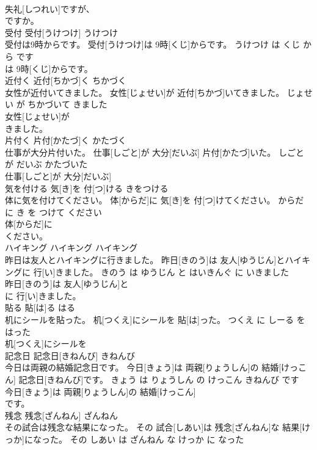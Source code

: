 \documentclass[8pt]{extreport}
\begin{document}
\begin{CJK}{UTF8}{min}
\\	失礼[しつれい]ですが、
\\	ですか。		
\\	受付	受付[うけつけ]	うけつけ	
\\	受付は9時からです。	受付[うけつけ]は 9時[くじ]からです。	うけつけ は くじ から です	
\\	は 9時[くじ]からです。		
\\	近付く	近付[ちかづ]く	ちかづく	
\\	女性が近付いてきました。	女性[じょせい]が 近付[ちかづ]いてきました。	じょせい が ちかづいて きました	
\\	女性[じょせい]が
\\	きました。		
\\	片付く	片付[かたづ]く	かたづく	
\\	仕事が大分片付いた。	仕事[しごと]が 大分[だいぶ] 片付[かたづ]いた。	しごと が だいぶ かたづいた	
\\	仕事[しごと]が 大分[だいぶ]
\\	気を付ける	気[き]を 付[つ]ける	きをつける	
\\	体に気を付けてください。	体[からだ]に 気[き]を 付[つ]けてください。	からだ に き を つけて ください	
\\	体[からだ]に
\\	ください。		
\\	ハイキング	ハイキング	ハイキング	
\\	昨日は友人とハイキングに行きました。	昨日[きのう]は 友人[ゆうじん]とハイキングに 行[い]きました。	きのう は ゆうじん と はいきんぐ に いきました	
\\	昨日[きのう]は 友人[ゆうじん]と
\\	に 行[い]きました。		
\\	貼る	貼[は]る	はる	
\\	机にシールを貼った。	机[つくえ]にシールを 貼[は]った。	つくえ に しーる を はった	
\\	机[つくえ]にシールを
\\	記念日	記念日[きねんび]	きねんび	
\\	今日は両親の結婚記念日です。	今日[きょう]は 両親[りょうしん]の 結婚[けっこん] 記念日[きねんび]です。	きょう は りょうしん の けっこん きねんび です	
\\	今日[きょう]は 両親[りょうしん]の 結婚[けっこん]
\\	です。		
\\	残念	残念[ざんねん]	ざんねん	
\\	その試合は残念な結果になった。	その 試合[しあい]は 残念[ざんねん]な 結果[けっか]になった。	その しあい は ざんねん な けっか に なった	

\end{CJK}
\end{document}
